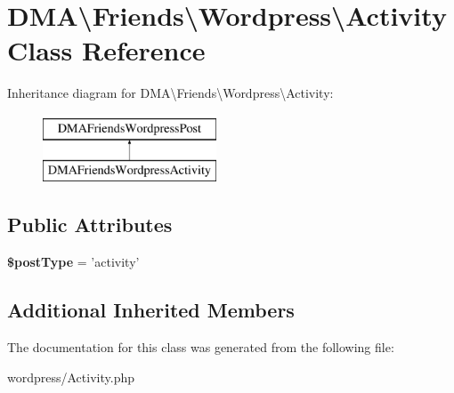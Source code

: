 \hypertarget{classDMA_1_1Friends_1_1Wordpress_1_1Activity}{\section{D\-M\-A\textbackslash{}Friends\textbackslash{}Wordpress\textbackslash{}Activity Class Reference}
\label{classDMA_1_1Friends_1_1Wordpress_1_1Activity}
}
Inheritance diagram for D\-M\-A\textbackslash{}Friends\textbackslash{}Wordpress\textbackslash{}Activity\-:\begin{figure}[H]
\begin{center}
\leavevmode
\includegraphics[height=2.000000cm]{de/d54/classDMA_1_1Friends_1_1Wordpress_1_1Activity}
\end{center}
\end{figure}
\subsection*{Public Attributes}
\begin{DoxyCompactItemize}
\item 
\hypertarget{classDMA_1_1Friends_1_1Wordpress_1_1Activity_a06a7b4fad854f04e2282f92e9829c3d3}{{\bfseries \$post\-Type} = 'activity'}\label{classDMA_1_1Friends_1_1Wordpress_1_1Activity_a06a7b4fad854f04e2282f92e9829c3d3}

\end{DoxyCompactItemize}
\subsection*{Additional Inherited Members}


The documentation for this class was generated from the following file\-:\begin{DoxyCompactItemize}
\item 
wordpress/Activity.\-php\end{DoxyCompactItemize}
